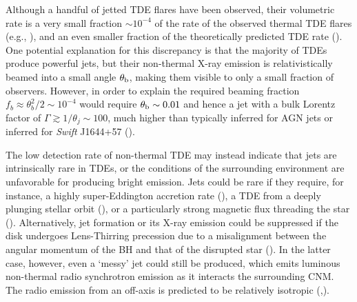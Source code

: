\documentclass[usenatbib,fleqn]{mnras}
\begin{document}
Although a handful of jetted TDE flares have been observed, their
volumetric rate is a very small fraction $\sim 10^{-4}$ of the rate of
the observed thermal TDE flares (e.g., \citealt{Burrows+2011}), and an
even smaller fraction of the theoretically predicted TDE rate
(\citealt{Stone&Metzger2015}).  One potential explanation for this
discrepancy is that the majority of TDEs produce powerful jets, but
their non-thermal X-ray emission is relativistically beamed into a
small angle $\theta_{\rm b}$, making them visible to only a small
fraction of observers.  However, in order to explain the required
beaming fraction $f_b \approx \theta_{b}^{2}/2 \sim 10^{-4}$ would
require $\theta_{\rm b} \sim 0.01$ and hence a jet with a bulk Lorentz
factor of $\Gamma \gtrsim 1/\theta_j \sim 100$, much higher than
typically inferred for AGN jets or inferred for {\it Swift} J1644+57
(\citealt{Metzger+2012}).

The low detection rate of non-thermal TDE may instead indicate that
jets are intrinsically rare in TDEs, or the conditions of the
surrounding environment are unfavorable for producing bright emission.
Jets could be rare if they require, for instance, a highly
super-Eddington accretion rate (\citealt{De-Colle+2012}), a TDE from a
deeply plunging stellar orbit (\citealt{Metzger&Stone2015}), or a
particularly strong magnetic flux threading the star
(\citealt{Tchekhovskoy+2014,Kelley+2014}).  Alternatively, jet formation
or its X-ray emission could be suppressed if the disk undergoes
Lens-Thirring precession due to a misalignment between the angular
momentum of the BH and that of the disrupted star
(\citealt{Stone&Loeb2012}).  In the latter case, however, even a `messy'
jet could still be produced, which emits luminous non-thermal radio
synchrotron emission as it interacts the surrounding CNM.  The radio
emission from an off-axis is predicted to be relatively isotropic
(\citealt{Giannios&Metzger2011},\citealt{Mimica+2015}).
\end{document}

